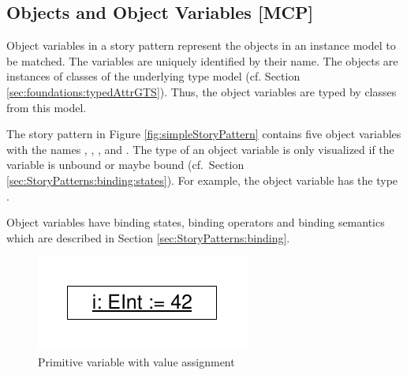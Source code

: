 
\subsection{Objects and Object Variables [MCP]}
\label{sec:StoryPatterns:objects}

Object variables in a story pattern represent the objects in an instance model to be matched.
The variables are uniquely identified by their name.
The objects are instances of classes of the underlying type model (cf.
Section \ref{sec:foundations:typedAttrGTS}). Thus, the object variables are typed by classes from this model.

The story pattern in Figure \ref{fig:simpleStoryPattern} contains five
object variables with the names , , ,  and
. 
The type of an object variable is only visualized if the
variable is unbound or maybe bound (cf.\ Section
\ref{sec:StoryPatterns:binding:states}). For example, the object variable  has the type .

Object variables have binding states, binding operators and binding semantics which are described in Section  \ref{sec:StoryPatterns:binding}.


\ext %
{

\begin{figure}[htbp]
  \centering
  \includegraphics[scale=0.6]{figures/PrimitiveVariable}
  \caption{Primitive variable with value assignment}
  \label{fig:primitiveVariable}
\end{figure}

}%



